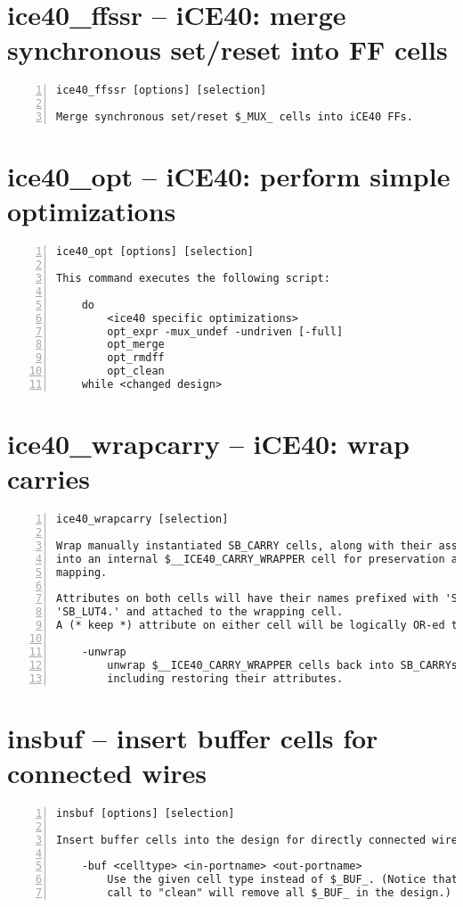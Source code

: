 \section{ice40\_ffssr -- iCE40: merge synchronous set/reset into FF cells}
\label{cmd:ice40_ffssr}
\begin{lstlisting}[numbers=left,frame=single]
    ice40_ffssr [options] [selection]

Merge synchronous set/reset $_MUX_ cells into iCE40 FFs.
\end{lstlisting}

\section{ice40\_opt -- iCE40: perform simple optimizations}
\label{cmd:ice40_opt}
\begin{lstlisting}[numbers=left,frame=single]
    ice40_opt [options] [selection]

This command executes the following script:

    do
        <ice40 specific optimizations>
        opt_expr -mux_undef -undriven [-full]
        opt_merge
        opt_rmdff
        opt_clean
    while <changed design>
\end{lstlisting}

\section{ice40\_wrapcarry -- iCE40: wrap carries}
\label{cmd:ice40_wrapcarry}
\begin{lstlisting}[numbers=left,frame=single]
    ice40_wrapcarry [selection]

Wrap manually instantiated SB_CARRY cells, along with their associated SB_LUT4s,
into an internal $__ICE40_CARRY_WRAPPER cell for preservation across technology
mapping.

Attributes on both cells will have their names prefixed with 'SB_CARRY.' or
'SB_LUT4.' and attached to the wrapping cell.
A (* keep *) attribute on either cell will be logically OR-ed together.

    -unwrap
        unwrap $__ICE40_CARRY_WRAPPER cells back into SB_CARRYs and SB_LUT4s,
        including restoring their attributes.
\end{lstlisting}

\section{insbuf -- insert buffer cells for connected wires}
\label{cmd:insbuf}
\begin{lstlisting}[numbers=left,frame=single]
    insbuf [options] [selection]

Insert buffer cells into the design for directly connected wires.

    -buf <celltype> <in-portname> <out-portname>
        Use the given cell type instead of $_BUF_. (Notice that the next
        call to "clean" will remove all $_BUF_ in the design.)
\end{lstlisting}

